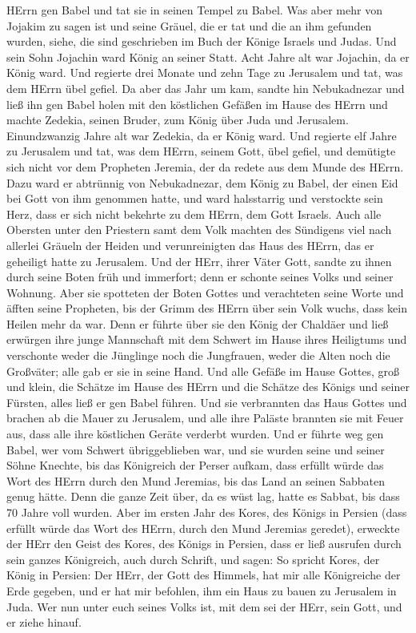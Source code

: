 HErrn gen Babel und tat sie in seinen Tempel zu Babel.  Was
aber mehr von Jojakim zu sagen ist und seine Gräuel, die er tat und die
an ihm gefunden wurden, siehe, die sind geschrieben im Buch der Könige
Israels und Judas. Und sein Sohn Jojachin ward König an seiner Statt.
 Acht Jahre alt war Jojachin, da er König ward. Und regierte
drei Monate und zehn Tage zu Jerusalem und tat, was dem HErrn übel
gefiel.  Da aber das Jahr um kam, sandte hin Nebukadnezar
und ließ ihn gen Babel holen mit den köstlichen Gefäßen im Hause des
HErrn und machte Zedekia, seinen Bruder, zum König über Juda und
Jerusalem.  Einundzwanzig Jahre alt war Zedekia, da er
König ward. Und regierte elf Jahre zu Jerusalem  und tat,
was dem HErrn, seinem Gott, übel gefiel, und demütigte sich nicht vor
dem Propheten Jeremia, der da redete aus dem Munde des HErrn.
 Dazu ward er abtrünnig von Nebukadnezar, dem König zu
Babel, der einen Eid bei Gott von ihm genommen hatte, und ward
halsstarrig und verstockte sein Herz, dass er sich nicht bekehrte zu dem
HErrn, dem Gott Israels.  Auch alle Obersten unter den
Priestern samt dem Volk machten des Sündigens viel nach allerlei Gräueln
der Heiden und verunreinigten das Haus des HErrn, das er geheiligt hatte
zu Jerusalem.  Und der HErr, ihrer Väter Gott, sandte zu
ihnen durch seine Boten früh und immerfort; denn er schonte seines Volks
und seiner Wohnung.  Aber sie spotteten der Boten Gottes
und verachteten seine Worte und äfften seine Propheten, bis der Grimm
des HErrn über sein Volk wuchs, dass kein Heilen mehr da war.
 Denn er führte über sie den König der Chaldäer und ließ
erwürgen ihre junge Mannschaft mit dem Schwert im Hause ihres Heiligtums
und verschonte weder die Jünglinge noch die Jungfrauen, weder die Alten
noch die Großväter; alle gab er sie in seine Hand.  Und
alle Gefäße im Hause Gottes, groß und klein, die Schätze im Hause des
HErrn und die Schätze des Königs und seiner Fürsten, alles ließ er gen
Babel führen.  Und sie verbrannten das Haus Gottes und
brachen ab die Mauer zu Jerusalem, und alle ihre Paläste brannten sie
mit Feuer aus, dass alle ihre köstlichen Geräte verderbt wurden.
 Und er führte weg gen Babel, wer vom Schwert
übriggeblieben war, und sie wurden seine und seiner Söhne Knechte, bis
das Königreich der Perser aufkam,  dass erfüllt würde das
Wort des HErrn durch den Mund Jeremias, bis das Land an seinen Sabbaten
genug hätte. Denn die ganze Zeit über, da es wüst lag, hatte es Sabbat,
bis dass 70 Jahre voll wurden.  Aber im ersten Jahr des
Kores, des Königs in Persien (dass erfüllt würde das Wort des HErrn,
durch den Mund Jeremias geredet), erweckte der HErr den Geist des Kores,
des Königs in Persien, dass er ließ ausrufen durch sein ganzes
Königreich, auch durch Schrift, und sagen:  So spricht
Kores, der König in Persien: Der HErr, der Gott des Himmels, hat mir
alle Königreiche der Erde gegeben, und er hat mir befohlen, ihm ein Haus
zu bauen zu Jerusalem in Juda. Wer nun unter euch seines Volks ist, mit
dem sei der HErr, sein Gott, und er ziehe hinauf.
